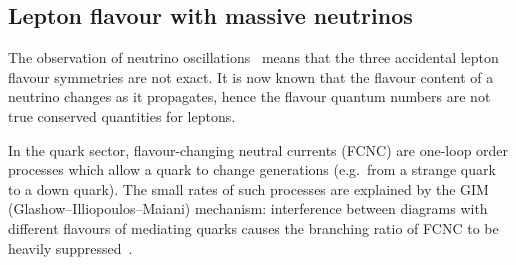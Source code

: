 \subsection{Lepton flavour with massive neutrinos}
The observation of neutrino oscillations~\cite{PhysRevLett.81.1562} means that
the three accidental lepton flavour symmetries are not exact. It is now known
that the flavour content of a neutrino changes as it propagates, hence the
flavour quantum numbers are not true conserved quantities for leptons. 

In the quark sector, flavour-changing neutral currents (FCNC) are one-loop order
processes which allow a quark to change generations (e.g.\ from a strange quark
to a down quark). The small rates of such processes are explained by the GIM
(Glashow--Illiopoulos--Maiani) mechanism: interference between diagrams with
different flavours of mediating quarks causes the branching ratio of FCNC to be
heavily suppressed~\cite{PhysRevD.2.1285}.




